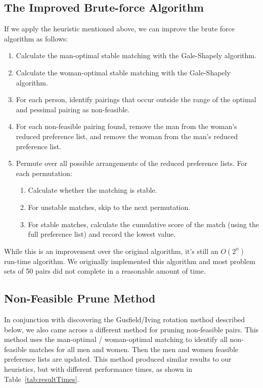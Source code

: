 \documentclass[a4paper]{article}
\begin{document}
\subsection{The Improved Brute-force Algorithm}
If we apply the heuristic mentioned above, we can improve the brute force algorithm as follows:
\begin{enumerate}
    \item Calculate the man-optimal stable matching with the Gale-Shapely algorithm.
    \item Calculate the woman-optimal stable matching with the Gale-Shapely algorithm.
    \item For each person, identify pairings that occur outside the range of the optimal and pessimal pairing as non-feasible.
    
    \item For each non-feasible pairing found, remove the man from the woman's reduced preference list, and remove the woman from the man's reduced preference list.
    
    \item Permute over all possible arrangements of the reduced preference lists. For each permutation:
    \begin{enumerate}
        \item Calculate whether the matching is stable.
        \item For unstable matches, skip to the next permutation.
        \item For stable matches, calculate the cumulative score of the match (using the full preference list) and record the lowest value.
    \end{enumerate}

\end{enumerate}

While this is an improvement over the original algorithm, it's still an $O(2^n)$ run-time algorithm. We originally implemented this algorithm and most problem sets of 50 pairs did not complete in a reasonable amount of time.

\subsection{Non-Feasible Prune Method}
In conjunction with discovering the Gusfield/Iving \cite{gusfield} rotation method described below, we also came across a different method for pruning non-feasible pairs.  This method uses the man-optimal / woman-optimal matching to identify all non-feasible matches for all men and women.  Then the men and women feasible preference lists are updated.  This method produced similar results to our heuristics, but with different performance times, as shown in Table~\ref{tab:resultTimes}. 
\end{document}
